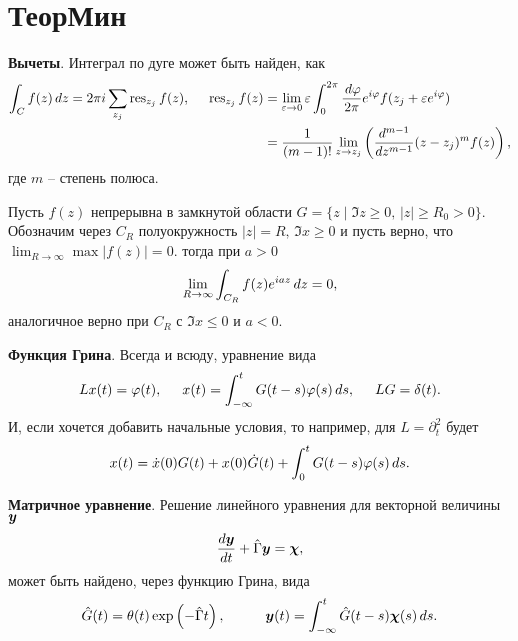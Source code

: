\section*{ТеорМин}



\textbf{Вычеты}. Интеграл по дуге может быть найден, как
\begin{align*}
    \int_C f(z) \, d z = 2 \pi i \sum_{z_j} \mathop{\mathrm{res}}\nolimits_{z_j} f(z),
    \hspace{5 mm} 
    \mathop{\mathrm{res}}\nolimits_{z_j} f(z) &= \lim_{\varepsilon \to 0} \varepsilon \int_0^{2\pi} \frac{\, d \varphi}{2\pi} e^{i \varphi} f(z_j + \varepsilon e^{i \varphi}) \\ 
    &= \frac{1}{(m-1)!} \lim_{z \to z_j} \left(
        \frac{d^{m-1} }{d z^{m-1}} (z-z_j)^m f(z)
    \right),
\end{align*}
где $m$ -- степень полюса. 



\begin{to_lem}
    Пусть $f(z)$ непрерывна в замкнутой области $G = \{z \mid \Im z \geq 0,\,  |z| \geq R_0 > 0\}$. Обозначим через $C_R$ полуокружность $|z| = R,\, \Im x \geq 0$ и пусть верно, что $\lim_{R \to \infty} \max |f(z)| =0$. тогда при $a > 0$
    \begin{equation*}
        \lim_{R \to \infty} \int_{C_R} f(z) e^{i a z} \, d z = 0,
    \end{equation*}
    аналогичное верно при $C_R$ с $\Im x \leq 0$ и $a < 0$. 
\end{to_lem}



\textbf{Функция Грина}. Всегда и всюду, уравнение вида
\begin{equation*}
    L x(t) = \varphi(t), 
    \hspace{5 mm}   
    x(t) = \int_{-\infty}^{t} G(t-s) \varphi(s) \, d s,
    \hspace{5 mm} 
    L G = \delta(t).
\end{equation*}
И, если хочется добавить начальные условия, то например, для $L = \partial_t^2$ будет
\begin{equation*}
    x(t) = \dot{x}(0) G(t) + x(0) \dot{G}(t) + \int_{0}^{t} G(t-s) \varphi(s) \, d s.
\end{equation*}




\textbf{Матричное уравнение}. Решение линейного уравнения для векторной величины $\mbox{\boldmath $y$}$
\begin{equation*}
    \frac{d \mbox{\boldmath $y$}}{d t} + \hat{\Gamma} \mbox{\boldmath $y$} = \mbox{\boldmath $\chi$},
\end{equation*}
может быть найдено, через функцию Грина, вида
\begin{equation*}
    \hat{G} (t) = \theta(t) \exp\left(- \hat{\Gamma} t\right),
    \hspace{10 mm} 
    \vc{y}(t) = \int_{-\infty}^{t}  \hat{G}(t-s) \vc{\chi}(s) \d s.
\end{equation*}


